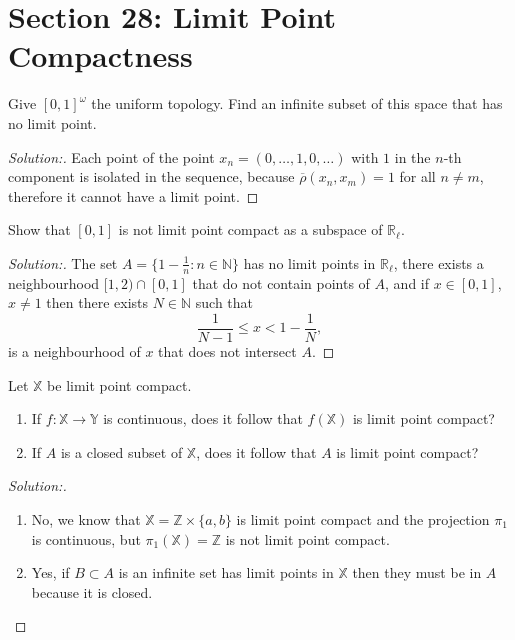 \documentclass[a4paper,12pt, reqno]{article}
\theoremstyle{definition}
\newenvironment{exerr}[1]{
  \renewcommand\theexeralt{#1}
  \exeralt
}{\endexeralt}
\newenvironment{solution}{\begin{proof}[Solution:]}{\end{proof}}
\newcommand{\R}{\mathbb{R}}
\newcommand{\Z}{\mathbb{Z}}
\newcommand{\N}{\mathbb{N}}
\newcommand{\X}{\mathbb{X}}
\newcommand{\Y}{\mathbb{Y}}
\begin{document}
\section*{Section 28: Limit Point Compactness}

\begin{exerr}{1}
  Give $[0,1]^\omega$ the uniform topology. Find an infinite subset of this space that has no limit point.
\end{exerr}
\begin{solution}
  Each point of the point $x_{n} = (0,\dots,1,0,\dots)$ with $1$ in the $n$-th component is isolated in the sequence, because $\overline{\rho}(x_{n},x_{m}) = 1$ for all $n\neq m$, therefore it cannot have a limit point.
\end{solution}

\begin{exerr}{2}
  Show that $[0,1]$ is not limit point compact as a subspace of $\R_{\ell}$.
\end{exerr}
\begin{solution}
  The set $A = \{ 1-\frac{1}{n} : n\in\N \}$ has no limit points in $\R_{\ell}$, there exists a neighbourhood $[1,2)\cap [0,1]$ that do not contain points of $A$, and if $x\in[0,1]$, $x\neq1$ then there exists $N\in\N$ such that
  \begin{equation*}
      \frac{1}{N-1}\leq x < 1 - \frac{1}{N},
  \end{equation*}
  is a neighbourhood of $x$ that does not intersect $A$.
\end{solution}

\begin{exerr}{3}
  Let $\X$ be limit point compact.
  \begin{enumerate}[label=(\alph*)]
    \item If $f:\X\to\Y$ is continuous, does it follow that $f(\X)$ is limit point compact?
    \item If $A$ is a closed subset of $\X$, does it follow that $A$ is limit point compact?
  \end{enumerate}
\end{exerr}
\begin{solution}\hfill
  \begin{enumerate}[label=(\alph*)]
    \item No, we know that $\X = \Z\times\{ a,b \} $ is limit point compact and the projection $\pi_{1}$ is continuous, but $\pi_{1}(\X) = \Z$ is not limit point compact.
    \item Yes, if $B\subset A$ is an infinite set has limit points in $\X$ then they must be in $A$ because it is closed.
  \end{enumerate}
\end{solution}
\end{document}
